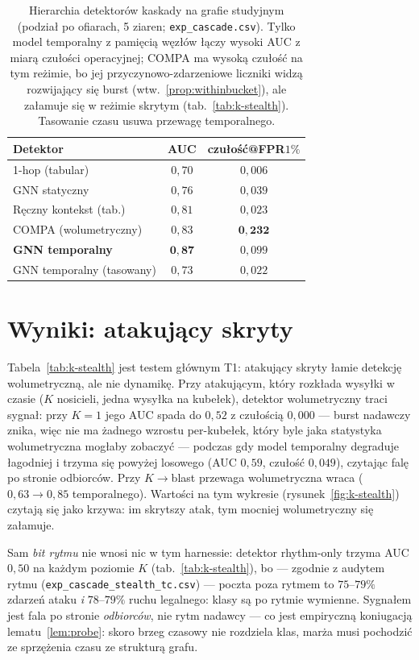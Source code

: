 \begin{table}[htbp]\centering
\begin{tabular}{lcc}
\toprule
Detektor & AUC & czułość@FPR$1\%$ \\
\midrule
1-hop (tabular)            & $0{,}70$ & $0{,}006$ \\
GNN statyczny              & $0{,}76$ & $0{,}039$ \\
Ręczny kontekst (tab.)     & $0{,}81$ & $0{,}023$ \\
COMPA (wolumetryczny)      & $0{,}83$ & $\mathbf{0{,}232}$ \\
\textbf{GNN temporalny}    & $\mathbf{0{,}87}$ & $0{,}099$ \\
GNN temporalny (tasowany)   & $0{,}73$ & $0{,}022$ \\
\bottomrule
\end{tabular}
\caption{Hierarchia detektorów kaskady na grafie studyjnym (podział
po ofiarach, 5 ziaren; \texttt{exp\_cascade.csv}). Tylko model
temporalny z pamięcią węzłów łączy wysoki AUC z miarą czułości
operacyjnej; COMPA ma wysoką czułość na tym reżimie, bo jej
przyczynowo-zdarzeniowe liczniki widzą rozwijający się burst
(wtw.~\ref{prop:withinbucket}), ale załamuje się w reżimie skrytym
(tab.~\ref{tab:k-stealth}). Tasowanie czasu usuwa przewagę
temporalnego.}
\label{tab:k-detektory}
\end{table}

\section{Wyniki: atakujący skryty}
\label{sec:k-stealth}

Tabela~\ref{tab:k-stealth} jest testem głównym T1: atakujący skryty
łamie detekcję wolumetryczną, ale nie dynamikę. Przy atakującym,
który rozkłada wysyłki w czasie ($K$ nosicieli, jedna wysyłka na
kubełek), detektor wolumetryczny traci sygnał: przy $K{=}1$ jego AUC
spada do $0{,}52$ z czułością $0{,}000$ --- burst nadawczy znika,
więc nie ma żadnego wzrostu per-kubełek, który byle jaka statystyka
wolumetryczna mogłaby zobaczyć --- podczas gdy model temporalny
degraduje łagodniej i trzyma się powyżej losowego (AUC $0{,}59$,
czułość $0{,}049$), czytając falę po stronie odbiorców. Przy
$K\to$blast przewaga wolumetryczna wraca ($0{,}63\to0{,}85$
temporalnego). Wartości na tym wykresie (rysunek~\ref{fig:k-stealth})
czytają się jako krzywa: im skrytszy atak, tym mocniej wolumetryczny
się załamuje.

Sam \emph{bit rytmu} nie wnosi nic w tym harnessie: detektor
rhythm-only trzyma AUC $0{,}50$ na każdym poziomie $K$
(tab.~\ref{tab:k-stealth}), bo --- zgodnie z audytem rytmu
(\texttt{exp\_cascade\_stealth\_tc.csv}) --- poczta poza rytmem
to $75$--$79\%$ zdarzeń ataku \emph{i} $78$--$79\%$ ruchu legalnego:
klasy są po rytmie wymienne. Sygnałem jest fala po stronie
\emph{odbiorców}, nie rytm nadawcy --- co jest empiryczną
koniugacją lematu~\ref{lem:probe}: skoro brzeg czasowy nie
rozdziela klas, marża musi pochodzić ze sprzężenia czasu ze
strukturą grafu.

